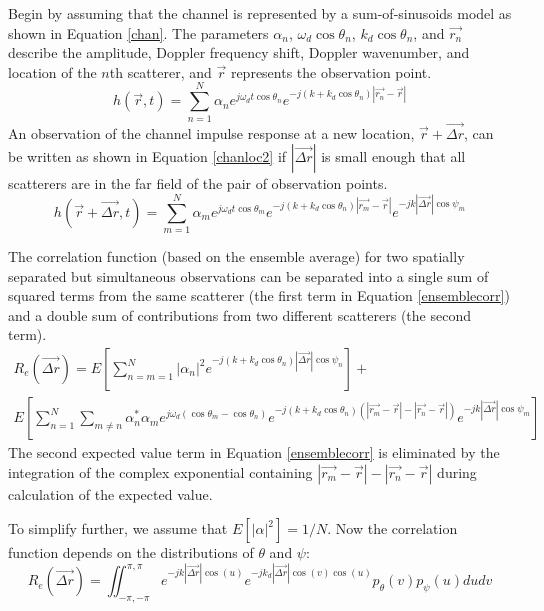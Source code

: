 \documentclass[11pt]{article} %
\begin{document}
Begin by assuming that the channel is represented by a sum-of-sinusoids model as shown in Equation \ref{chan}.  The parameters $\alpha_n$, $\omega_d\cos\theta_n$, $k_d\cos\theta_n$, and $\vec{r_n}$ describe the amplitude, Doppler frequency shift, Doppler wavenumber, and location of the $n$th scatterer, and $\vec{r}$ represents the observation point.
\begin{equation}\label{chan}
h(\vec{r},t)= \sum_{n=1}^N \alpha_n e^{j \omega_d t \cos \theta_n} e^{-j(k+k_d\cos\theta_n)\left|\vec{r_n} - \vec{r}\right|}
\end{equation}
An observation of the channel impulse response at a new location, $\vec{r}+\vec{\Delta r}$, can be written as shown in Equation \ref{chanloc2} if $|\vec{\Delta r}|$ is small enough that all scatterers are in the far field of the pair of observation points.
\begin{equation}\label{chanloc2}
h(\vec{r}+\vec{\Delta r},t) = \sum_{m=1}^N \alpha_m e^{j \omega_d t \cos \theta_m} e^{-j(k+k_d\cos\theta_n)\left|\vec{r_m}-\vec{r}\right|}e^{-jk\left|\vec{\Delta r}\right| \cos \psi_m}
\end{equation}

The correlation function (based on the ensemble average) for two spatially separated but simultaneous observations can be separated into a single sum of squared terms from the same scatterer (the first term in Equation \ref{ensemblecorr}) and a double sum of contributions from two different scatterers (the second term).
\begin{multline}\label{ensemblecorr}
R_e(\vec{\Delta r})= E\left[\sum_{n=m=1}^N |\alpha_n|^2 e^{-j(k+k_d\cos\theta_n)|\vec{\Delta r}|\cos \psi_n}\right] +\\ E\left[\sum_{n=1}^N\sum_{m\neq n} \alpha_n^* \alpha_m e^{j \omega_d (\cos \theta_m - \cos \theta_n)} e^{-j(k+k_d\cos\theta_n)\left(\left|\vec{r_m} - \vec{r}\right|-\left|\vec{r_n} - \vec{r}\right|\right)}e^{-jk\left|\vec{\Delta r}\right| \cos \psi_m}\right]
\end{multline}
The second expected value term in Equation \ref{ensemblecorr} is eliminated by the integration of the complex exponential containing $\left|\vec{r_m} - \vec{r}\right|-\left|\vec{r_n} - \vec{r}\right|$ during calculation of the expected value.  

To simplify further, we assume that $E[|\alpha|^2]=1/N$.  Now the correlation function depends on the distributions of $\theta$ and $\psi$:
\begin{equation}\label{generalcorr}
R_e(\vec{\Delta r})=\iint_{-\pi, -\pi}^{\pi,\pi}e^{-j k |\vec{\Delta r}| \cos(u)} e^{-j k_d |\vec{\Delta r}| \cos (v) \cos(u)} p_{\theta}(v) p_{\psi}(u) du dv
\end{equation}
\end{document}
